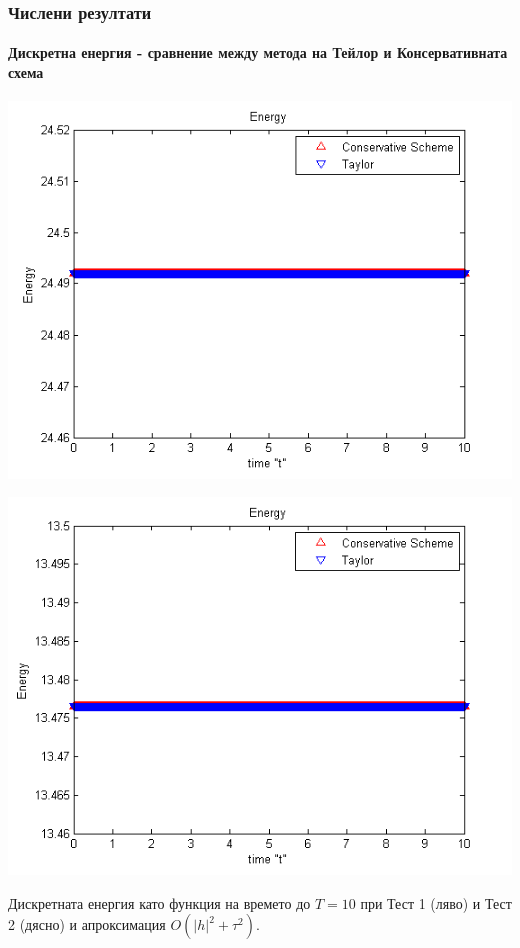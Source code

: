 \documentclass{beamer}
\begin{document}

\begin{frame}
\frametitle{Числени резултати}
\framesubtitle{Дискретна енергия - сравнение между метода на Тейлор и Консервативната схема}

\begin{center}\vspace{0.4cm}
	\begin{minipage}[b]{0.49\linewidth}
		\includegraphics[width=\linewidth]{../amitans/figures/Energy_bt3_c045_h005.png}
	\end{minipage}	
	\begin{minipage}[b]{0.49\linewidth}
		\includegraphics[width=\linewidth]{../amitans/figures/Energy_bt1_c090_h010.png}
		
	\end{minipage}
\end{center}
Дискретната енергия като функция на времето до $T = 10$ при Тест 1 (ляво) и Тест 2 (дясно) и апроксимация $O(|h|^2 + \tau^2)$.
\end{frame}
\end{document}
